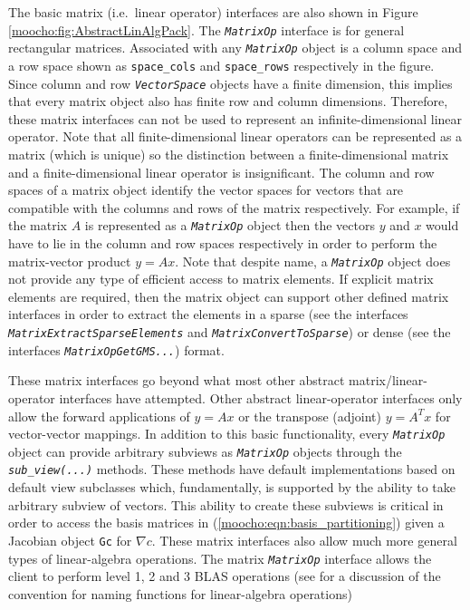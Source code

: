 \documentclass[pdf,ps2pdf,11pt]{SANDreport}
\begin{document}
The basic matrix (i.e.\ linear operator) interfaces are also shown in Figure
{}\ref{moocho:fig:AbstractLinAlgPack}.  The {}\texttt{\textit{Matrix\-Op}}
interface is for general rectangular matrices.  Associated with any
{}\texttt{\textit{Matrix\-Op}} object is a column space and a row space shown
as {}\texttt{space\_cols} and {}\texttt{space\_rows} respectively in the
figure.  Since column and row {}\texttt{\textit{Vector\-Space}} objects have a
finite dimension, this implies that every matrix object also has finite row
and column dimensions.  Therefore, these matrix interfaces can not be used to
represent an infinite-dimensional linear operator.  Note that all
finite-dimensional linear operators can be represented as a matrix (which is
unique) so the distinction between a finite-dimensional matrix and a
finite-dimensional linear operator is insignificant.  The column and row
spaces of a matrix object identify the vector spaces for vectors that are
compatible with the columns and rows of the matrix respectively.  For example,
if the matrix $A$ is represented as a {}\texttt{\textit{Matrix\-Op}} object
then the vectors $y$ and $x$ would have to lie in the column and row spaces
respectively in order to perform the matrix-vector product $y = A x$.  Note
that despite name, a {}\texttt{\textit{Matrix\-Op}} object does not provide
any type of efficient access to matrix elements.  If explicit matrix elements
are required, then the matrix object can support other defined matrix
interfaces in order to extract the elements in a sparse (see the interfaces
{}\texttt{\textit{Matrix\-Extract\-Sparse\-Elements}} and
{}\texttt{\textit{Matrix\-Convert\-To\-Sparse}}) or dense (see the interfaces
{}\texttt{\textit{Matrix\-Op\-Get\-GMS...}}) format.

These matrix interfaces go beyond what most other abstract
matrix/linear-operator interfaces have attempted.  Other abstract
linear-operator interfaces only allow the forward applications of $y = A x$ or
the transpose (adjoint) $y = A^T x$ for vector-vector mappings.  In addition
to this basic functionality, every {}\texttt{\textit{Matrix\-Op}} object can
provide arbitrary subviews as {}\texttt{\textit{Matrix\-Op}} objects through
the {}\texttt{\textit{sub\_view(...)}} methods.  These methods have default
implementations based on default view subclasses which, fundamentally, is
supported by the ability to take arbitrary subview of vectors.  This ability
to create these subviews is critical in order to access the basis matrices in
(\ref{moocho:eqn:basis_partitioning}) given a Jacobian object {}\texttt{Gc}
for $\nabla c$.  These matrix interfaces also allow much more general types of
linear-algebra operations.  The matrix {}\texttt{\textit{Matrix\-Op}}
interface allows the client to perform level 1, 2 and 3 BLAS operations (see
{}\cite{ref:moochodevguide} for a discussion of the convention for naming
functions for linear-algebra operations)
\end{document}
